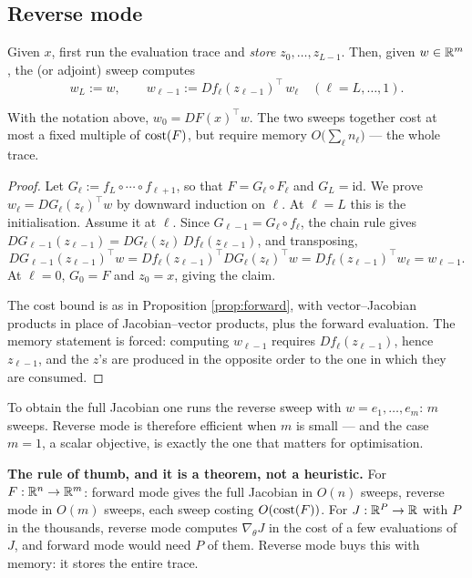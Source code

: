 \documentclass[11pt,a4paper]{article}
\begin{document}
\subsection{Reverse mode}

\begin{definition}\label{def:reverse}
Given $x$, first run the evaluation trace and \emph{store} $z_0,\dots,z_{L-1}$. Then, given
$w \in \mathbb{R}^m$, the  (or adjoint) sweep computes
\[
w_L := w, \qquad w_{\ell-1} := Df_\ell(z_{\ell-1})^{\!\top}\, w_\ell \quad (\ell = L,\dots,1).
\]
\end{definition}

\begin{proposition}\label{prop:reverse}
With the notation above, $w_0 = DF(x)^{\!\top} w$. The two sweeps together cost at most a fixed
multiple of $\operatorname{cost}(F)$, but require memory $O\big(\sum_{\ell} n_\ell\big)$ --- the whole trace.
\end{proposition}

\begin{proof}
Let $G_\ell := f_L \circ \cdots \circ f_{\ell+1}$, so that $F = G_\ell \circ F_\ell$ and
$G_L = \mathrm{id}$. We prove $w_\ell = DG_\ell(z_\ell)^{\!\top} w$ by downward induction on $\ell$.
At $\ell = L$ this is the initialisation. Assume it at $\ell$. Since
$G_{\ell-1} = G_\ell \circ f_\ell$, the chain rule gives
$DG_{\ell-1}(z_{\ell-1}) = DG_\ell(z_\ell)\, Df_\ell(z_{\ell-1})$, and transposing,
\[
DG_{\ell-1}(z_{\ell-1})^{\!\top} w
= Df_\ell(z_{\ell-1})^{\!\top} DG_\ell(z_\ell)^{\!\top} w
= Df_\ell(z_{\ell-1})^{\!\top} w_\ell = w_{\ell-1}.
\]
At $\ell = 0$, $G_0 = F$ and $z_0 = x$, giving the claim.

The cost bound is as in Proposition \ref{prop:forward}, with vector--Jacobian products in place of
Jacobian--vector products, plus the forward evaluation. The memory statement is forced: computing
$w_{\ell-1}$ requires $Df_\ell(z_{\ell-1})$, hence $z_{\ell-1}$, and the $z$'s are produced in the
opposite order to the one in which they are consumed.
\end{proof}

To obtain the full Jacobian one runs the reverse sweep with $w = e_1,\dots,e_m$: $m$ sweeps. Reverse
mode is therefore efficient when $m$ is small --- and the case $m = 1$, a scalar objective, is
exactly the one that matters for optimisation.

\begin{keybox}
\textbf{The rule of thumb, and it is a theorem, not a heuristic.} For $F : \mathbb{R}^n \to \mathbb{R}^m$:
forward mode gives the full Jacobian in $O(n)$ sweeps, reverse mode in $O(m)$ sweeps, each sweep
costing $O(\operatorname{cost}(F))$. For $J : \mathbb{R}^P \to \mathbb{R}$ with $P$ in the thousands, reverse mode computes
$\nabla_\theta J$ in the cost of a few evaluations of $J$, and forward mode would need $P$ of them.
Reverse mode buys this with memory: it stores the entire trace.
\end{keybox}
\end{document}
